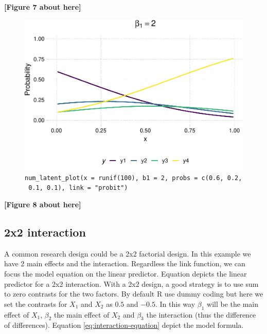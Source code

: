 \documentclass[
  man,floatsintext]{apa6}
\begin{document}
\begin{center}\textbf{[Figure 7 about here]} \end{center}

\normalsize

\scriptsize

\begin{figure}

{\centering \includegraphics{paper-new_files/figure-latex/fig-example-num-latent-1} 

}

\caption{\texttt{num\_latent\_plot(x\ =\ runif(100),\ b1\ =\ 2,\ probs\ =\ c(0.6,\ 0.2,\ 0.1,\ 0.1),\ link\ =\ "probit")}}\label{fig:fig-example-num-latent}
\end{figure}

\begin{center}\textbf{[Figure 8 about here]} \end{center}

\normalsize

\subsection{2x2 interaction}\label{x2-interaction}

A common research design could be a 2x2 factorial design. In this example we have 2 main effects and the interaction. Regardless the link function, we can focus the model equation on the linear predictor. Equation depicts the linear predictor for a 2x2 interaction. With a 2x2 design, a good strategy is to use sum to zero contrasts for the two factors. By default R use dummy coding but here we set the contrasts for \(X_1\) and \(X_2\) as \(0.5\) and \(-0.5\). In this way \(\beta_1\) will be the main effect of \(X_1\), \(\beta_2\) the main effect of \(X_2\) and \(\beta_3\) the interaction (thus the difference of differences). Equation \eqref{eq:interaction-equation} depict the model formula.
\end{document}
